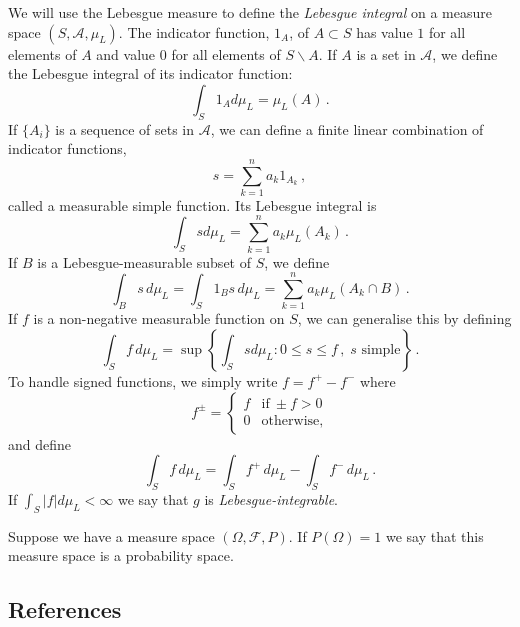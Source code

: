 We will use the Lebesgue measure to define the \emph{Lebesgue integral} on a measure space $(S, \mathcal{A}, \mu_L)$. The indicator function, $1_A$, of $A \subset S$ has value $1$ for all elements of $A$ and value $0$ for all elements of $S \backslash A$. If $A$ is a set in $\mathcal{A}$, we define the Lebesgue integral of its indicator function:
\begin{equation}
  \label{eq:4}
  \int_S 1_A d\mu_L = \mu_L(A) \,.
\end{equation}
If $\{A_i\}$ is a sequence of sets in $\mathcal{A}$, we can define a finite linear combination of indicator functions,
\begin{equation}
  \label{eq:5}
  s = \sum_{k=1}^n a_k 1_{A_k} \,,
\end{equation}
called a measurable simple function. Its Lebesgue integral is
\begin{equation}
  \label{eq:6}
  \int_S s d\mu_L = \sum_{k=1}^n a_k \mu_L(A_k) \,.
\end{equation}
If $B$ is a Lebesgue-measurable subset of $S$, we define
\begin{equation}
  \label{eq:7}
  \int_B s \, d\mu_L = \int_S 1_B s \, d\mu_L = \sum_{k=1}^n a_k \mu_L(A_k \cap B) \,.
\end{equation}
If $f$ is a non-negative measurable function on $S$, we can generalise this by defining
\begin{equation}
  \label{eq:8}
  \int_S f \, d\mu_L = \sup\left\{ \int_S s d\mu_L \colon 0 \leq s \leq f \,, \; s \text{ simple} \right\} \,.
\end{equation}
To handle signed functions, we simply write $f = f^+ - f^-$ where
\begin{equation}
  \label{eq:9}
  f^\pm =
  \begin{cases}
    f & \text{if} \: \pm f > 0 \\ 0 & \text{otherwise,}
  \end{cases}
\end{equation}
and define
\begin{equation}
  \label{eq:10}
  \int_S f \, d\mu_L = \int_S f^+ \, d\mu_L - \int_S f^- \, d\mu_L \,.
\end{equation}
If $\int_S |f| d\mu_L < \infty$ we say that $g$ is \emph{Lebesgue-integrable}.

Suppose we have a measure space $(\Omega, \mathcal{F}, P)$. If $P(\Omega) = 1$ we say that this measure space is a probability space.

\subsection{References}
